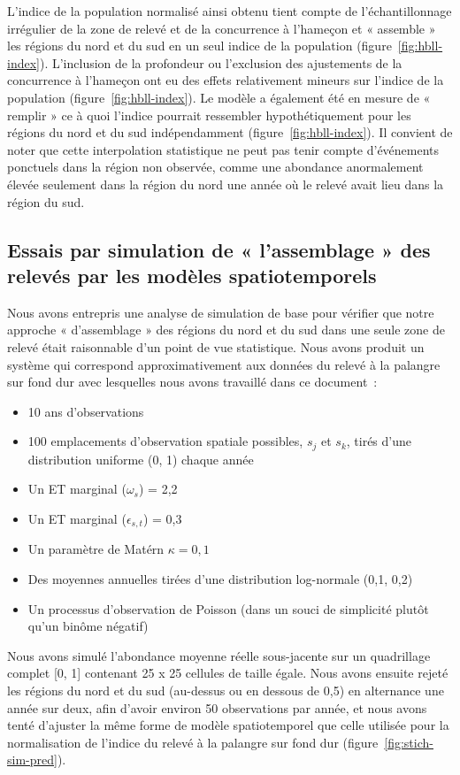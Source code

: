 \documentclass[11pt]{book}
\begin{document}
L'indice de la population normalisé ainsi obtenu tient compte de l'échantillonnage irrégulier de la zone de relevé et de la concurrence à l'hameçon et « assemble » les régions du nord et du sud en un seul indice de la population (figure~\ref{fig:hbll-index}). L'inclusion de la profondeur ou l'exclusion des ajustements de la concurrence à l'hameçon ont eu des effets relativement mineurs sur l'indice de la population (figure~\ref{fig:hbll-index}). Le modèle a également été en mesure de « remplir » ce à quoi l'indice pourrait ressembler hypothétiquement pour les régions du nord et du sud indépendamment (figure~\ref{fig:hbll-index}). Il convient de noter que cette interpolation statistique ne peut pas tenir compte d'événements ponctuels dans la région non observée, comme une abondance anormalement élevée seulement dans la région du nord une année où le relevé avait lieu dans la région du sud.

\hypertarget{sec:hbll-sim}{%
\subsection{Essais par simulation de « l'assemblage » des relevés par les modèles spatiotemporels}\label{sec:hbll-sim}}

Nous avons entrepris une analyse de simulation de base pour vérifier que notre approche « d'assemblage » des régions du nord et du sud dans une seule zone de relevé était raisonnable d'un point de vue statistique. Nous avons produit un système qui correspond approximativement aux données du relevé à la palangre sur fond dur avec lesquelles nous avons travaillé dans ce document~:
\begin{itemize}

\item
  10 ans d'observations
\item
  100 emplacements d'observation spatiale possibles, \(s_j\) et \(s_k\), tirés d'une distribution uniforme (0, 1) chaque année
\item
  Un ET marginal (\(\omega_s\)) = 2,2
\item
  Un ET marginal (\(\epsilon_{s,t}\)) = 0,3
\item
  Un paramètre de \mbox{Mat\'ern} \(\kappa = 0,1\)
\item
  Des moyennes annuelles tirées d'une distribution log-normale (0,1, 0,2)
\item
  Un processus d'observation de Poisson (dans un souci de simplicité plutôt qu'un binôme négatif)
\end{itemize}
Nous avons simulé l'abondance moyenne réelle sous-jacente sur un quadrillage complet {[}0, 1{]} contenant 25 x 25 cellules de taille égale. Nous avons ensuite rejeté les régions du nord et du sud (au-dessus ou en dessous de 0,5) en alternance une année sur deux, afin d'avoir environ 50 observations par année, et nous avons tenté d'ajuster la même forme de modèle spatiotemporel que celle utilisée pour la normalisation de l'indice du relevé à la palangre sur fond dur (figure~\ref{fig:stich-sim-pred}).
\end{document}

